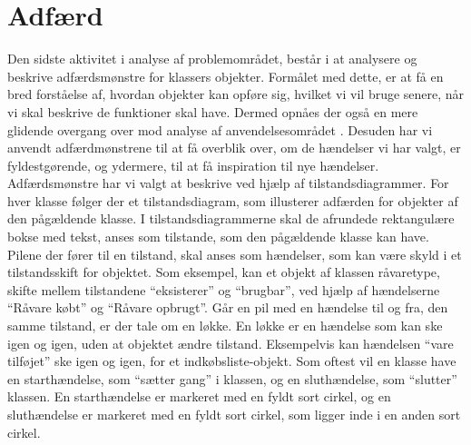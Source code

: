 \section{Adfærd}
\label{sec:adfaerd}

Den sidste aktivitet i analyse af problemområdet, består i at analysere og beskrive adfærdsmønstre for klassers objekter. Formålet med dette, er at få en bred forståelse af, hvordan objekter kan opføre sig, hvilket vi vil bruge senere, når vi skal beskrive de funktioner \Foodl{} skal have. Dermed opnåes der også en mere glidende overgang over mod analyse af anvendelsesområdet . Desuden har vi anvendt adfærdmønstrene til at få overblik over, om de hændelser vi har valgt, er fyldestgørende, og ydermere, til at få inspiration til nye hændelser. Adfærdsmønstre har vi valgt at beskrive ved hjælp af tilstandsdiagrammer. For hver klasse følger der et tilstandsdiagram, som illusterer adfærden for objekter af den pågældende klasse. I tilstandsdiagrammerne skal de afrundede rektangulære bokse med tekst, anses som tilstande, som den pågældende klasse kan have. Pilene der fører til en tilstand, skal anses som hændelser, som kan være skyld i et tilstandsskift for objektet. Som eksempel, kan et objekt af klassen råvaretype, skifte mellem tilstandene ``eksisterer'' og ``brugbar'', ved hjælp af hændelserne ``Råvare købt'' og ``Råvare opbrugt''. Går en pil med en hændelse til og fra, den samme tilstand, er der tale om en løkke. En løkke er en hændelse som kan ske igen og igen, uden at objektet ændre tilstand. Eksempelvis kan hændelsen ``vare tilføjet'' ske igen og igen, for et indkøbsliste-objekt. Som oftest vil en klasse have en starthændelse, som ``sætter gang'' i klassen, og en sluthændelse, som ``slutter'' klassen. En starthændelse er markeret med en fyldt sort cirkel, og en sluthændelse er markeret med en fyldt sort cirkel, som ligger inde i en anden sort cirkel.


%



%


